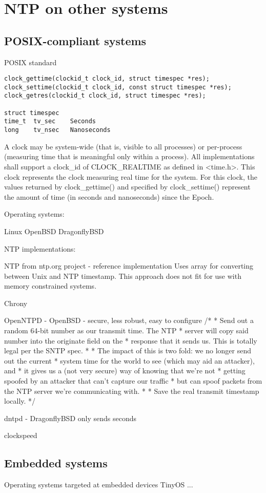 
\chapter{NTP on other systems}

\section{POSIX-compliant systems}
POSIX standard
\begin{lstlisting}[morekeywords={clockid_t,time_t}]
clock_gettime(clockid_t clock_id, struct timespec *res);
clock_settime(clockid_t clock_id, const struct timespec *res);
clock_getres(clockid_t clock_id, struct timespec *res);

struct timespec
time_t  tv_sec    Seconds
long    tv_nsec   Nanoseconds
\end{lstlisting}
A clock may be system-wide (that is, visible to all processes)
or per-process (measuring time that is meaningful only within a process).
All implementations shall support a clock\_id of CLOCK\_REALTIME as
defined in <time.h>.
This clock represents the clock measuring real time for the system.
For this clock, the values returned by clock\_gettime() and specified
by clock\_settime() represent the amount
of time (in seconds and nanoseconds) since the Epoch.


Operating systems:

Linux
OpenBSD
DragonflyBSD

NTP implementations:

NTP from ntp.org project - reference implementation
Uses array for converting between Unix and NTP timestamp.
This approach does not fit for use with memory constrained systems.

Chrony

OpenNTPD - OpenBSD - secure, less robust, easy to configure
	/*
	 * Send out a random 64-bit number as our transmit time.  The NTP
	 * server will copy said number into the originate field on the
	 * response that it sends us.  This is totally legal per the SNTP spec.
	 *
	 * The impact of this is two fold: we no longer send out the current
	 * system time for the world to see (which may aid an attacker), and
	 * it gives us a (not very secure) way of knowing that we're not
	 * getting spoofed by an attacker that can't capture our traffic
	 * but can spoof packets from the NTP server we're communicating with.
	 *
	 * Save the real transmit timestamp locally.
	 */

dntpd - DragonflyBSD
only sends seconds


clockspeed

\section{Embedded systems}
Operating systems targeted at embedded devices
TinyOS
...
